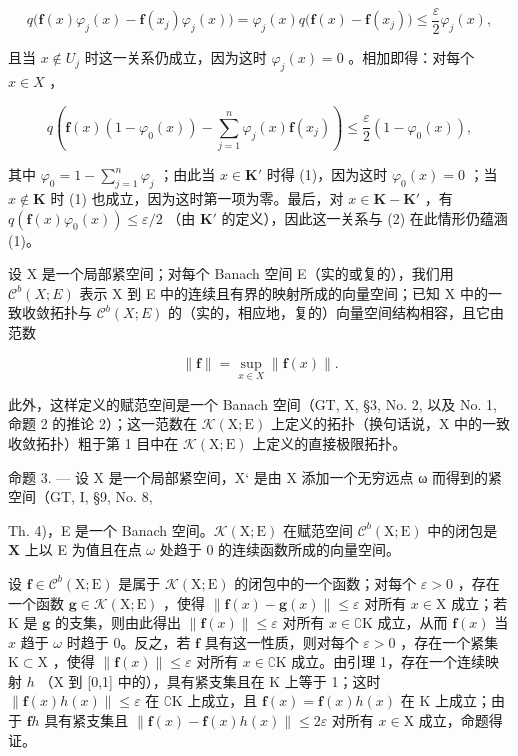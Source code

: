 \[
q \big (\mathbf {f} (x) \varphi_ {j} (x) - \mathbf {f} (x _ {j}) \varphi_ {j} (x) \big) = \varphi_ {j} (x) q \big (\mathbf {f} (x) - \mathbf {f} (x _ {j}) \big) \leqslant \frac {\varepsilon}{2} \varphi_ {j} (x),
\]

且当 \(x \notin U_{j}\) 时这一关系仍成立，因为这时 \(\varphi_{j}(x) = 0\) 。相加即得：对每个 \(x \in X\) ，

\[
q \left(\mathbf {f} (x) \left(1 - \varphi_ {0} (x)\right) - \sum_ {j = 1} ^ {n} \varphi_ {j} (x) \mathbf {f} \left(x _ {j}\right)\right) \leqslant \frac {\varepsilon}{2} \left(1 - \varphi_ {0} (x)\right),\tag{2}
\]

其中 \(\varphi_0 = 1 - \sum_{j=1}^{n} \varphi_j\) ；由此当 \(x \in \mathbf{K}'\) 时得 (1)，因为这时 \(\varphi_0(x) = 0\) ；当 \(x \notin \mathbf{K}\) 时 (1) 也成立，因为这时第一项为零。最后，对 \(x \in \mathbf{K} - \mathbf{K}'\) ，有 \(q(\mathbf{f}(x)\varphi_0(x)) \leqslant \varepsilon/2\) （由 \(\mathbf{K}'\) 的定义），因此这一关系与 (2) 在此情形仍蕴涵 (1)。

设 X 是一个局部紧空间；对每个 Banach 空间 E（实的或复的），我们用 \(\mathcal{C}^{b}(X;E)\) 表示 X 到 E 中的连续且有界的映射所成的向量空间；已知 X 中的一致收敛拓扑与 \(\mathcal{C}^{b}(X;E)\) 的（实的，相应地，复的）向量空间结构相容，且它由范数

\[
\| \mathbf {f} \| = \sup _ {x \in X} \| \mathbf {f} (x) \|.\tag{3}
\]

此外，这样定义的赋范空间是一个 Banach 空间（GT, X, §3, No. 2, 以及 No. 1, 命题 2 的推论 2）；这一范数在 \(\mathcal{K}(\mathrm{X};\mathrm{E})\) 上定义的拓扑（换句话说，X 中的一致收敛拓扑）粗于第 1 目中在 \(\mathcal{K}(\mathrm{X};\mathrm{E})\) 上定义的直接极限拓扑。

命题 3. --- 设 X 是一个局部紧空间，X‘ 是由 X 添加一个无穷远点 ω 而得到的紧空间（GT, I, §9, No. 8,

Th. 4)，E 是一个 Banach 空间。\(\mathcal{K}(\mathrm{X};\mathrm{E})\) 在赋范空间 \(\mathcal{C}^b (\mathrm{X};\mathrm{E})\) 中的闭包是 \(\mathbf{X}\) 上以 E 为值且在点 \(\omega\) 处趋于 0 的连续函数所成的向量空间。

设 \(\mathbf{f} \in \mathcal{C}^b(\mathrm{X};\mathrm{E})\) 是属于 \(\mathcal{K}(\mathrm{X};\mathrm{E})\) 的闭包中的一个函数；对每个 \(\varepsilon > 0\) ，存在一个函数 \(\mathbf{g} \in \mathcal{K}(\mathrm{X};\mathrm{E})\) ，使得 \(\| \mathbf{f}(x) - \mathbf{g}(x) \| \leqslant \varepsilon\) 对所有 \(x \in \mathrm{X}\) 成立；若 \(\mathrm{K}\) 是 \(\mathbf{g}\) 的支集，则由此得出 \(\| \mathbf{f}(x) \| \leqslant \varepsilon\) 对所有 \(x \in \complement \mathrm{K}\) 成立，从而 \(\mathbf{f}(x)\) 当 \(x\) 趋于 \(\omega\) 时趋于 0。反之，若 \(\mathbf{f}\) 具有这一性质，则对每个 \(\varepsilon > 0\) ，存在一个紧集 \(\mathrm{K} \subset \mathrm{X}\) ，使得 \(\| \mathbf{f}(x) \| \leqslant \varepsilon\) 对所有 \(x \in \complement \mathrm{K}\) 成立。由引理 1，存在一个连续映射 \(h\) （X 到 {[}0,1{]} 中的），具有紧支集且在 \(\mathrm{K}\) 上等于 1；这时 \(\| \mathbf{f}(x) h(x) \| \leqslant \varepsilon\) 在 \(\complement \mathrm{K}\) 上成立，且 \(\mathbf{f}(x) = \mathbf{f}(x) h(x)\) 在 \(\mathrm{K}\) 上成立；由于 \(\mathbf{f}h\) 具有紧支集且 \(\| \mathbf{f}(x) - \mathbf{f}(x) h(x) \| \leqslant 2\varepsilon\) 对所有 \(x \in \mathrm{X}\) 成立，命题得证。

